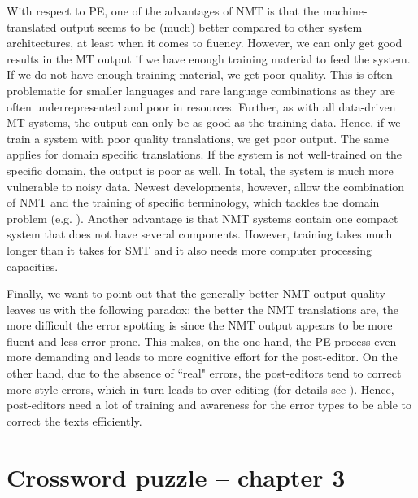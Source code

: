 With respect to PE, one of the advantages of NMT is that the machine-trans\-lated output seems to be (much) better compared to other system architectures, at least when it comes to fluency. However, we can only get good results in the MT output if we have enough training material to feed the system. If we do not have enough training material, we get poor quality. This is often problematic for smaller languages and rare language combinations as they are often underrepresented and poor in resources. Further, as with all data-driven MT systems, the output can only be as good as the training data. Hence, if we train a system with poor quality translations, we get poor output. The same applies for domain specific translations. If the system is not well-trained on the specific domain, the output is poor as well. In total, the system is much more vulnerable to noisy data. Newest developments, however, allow the combination of NMT and the training of specific terminology, which tackles the domain problem (e.g. \citealt{michon2020integrating}). Another advantage is that NMT systems contain one compact system that does not have several components. However, training takes much longer than it takes for SMT and it also needs more computer processing capacities.

Finally, we want to point out that the generally better NMT output quality leaves us with the following paradox: the better the NMT translations are, the more difficult the error spotting is since the NMT output appears to be more fluent and less error-prone. This makes, on the one hand, the PE process even more demanding and leads to more cognitive effort for the post-editor. On the other hand, due to the absence of ``real" errors, the post-editors tend to correct more style errors, which in turn leads to over-editing (for details see \citealt{vardaro2019translation}). Hence, post-editors need a lot of training and awareness for the error types to be able to correct the texts efficiently.

\section*{Crossword puzzle -- chapter 3}

